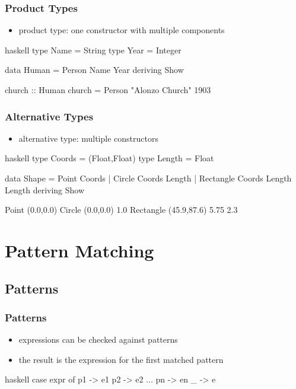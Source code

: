 \documentclass[dvipsnames]{beamer}
\theoremstyle{plain}
\begin{document}
\begin{frame}[fragile]
  \frametitle{Product Types}

  \begin{itemize}
    \item product type: one constructor with multiple components
  \end{itemize}

  \begin{exampleblock}{}
    \begin{pygments}{haskell}
type Name = String
type Year = Integer

data Human = Person Name Year
             deriving Show

church :: Human
church = Person "Alonzo Church" 1903
    \end{pygments}
  \end{exampleblock}
\end{frame}

\begin{frame}[fragile]
  \frametitle{Alternative Types}

  \begin{itemize}
    \item alternative type: multiple constructors
  \end{itemize}

  \begin{exampleblock}{}
    \begin{pygments}{haskell}
type Coords = (Float,Float)
type Length = Float

data Shape = Point Coords |
             Circle Coords Length |
             Rectangle Coords Length Length
             deriving Show

Point (0.0,0.0)
Circle (0.0,0.0) 1.0
Rectangle (45.9,87.6) 5.75 2.3
    \end{pygments}
  \end{exampleblock}
\end{frame}

\section{Pattern Matching}

\subsection{Patterns}

\begin{frame}[fragile]
  \frametitle{Patterns}

  \begin{itemize}
    \item expressions can be checked against patterns
    \item the result is the expression for the first matched pattern
  \end{itemize}

  \begin{block}{}
    \begin{pygments}{haskell}
case expr of
  p1 -> e1
  p2 -> e2
  ...
  pn -> en
  _  -> e
    \end{pygments}
  \end{block}
\end{frame}
\end{document}
